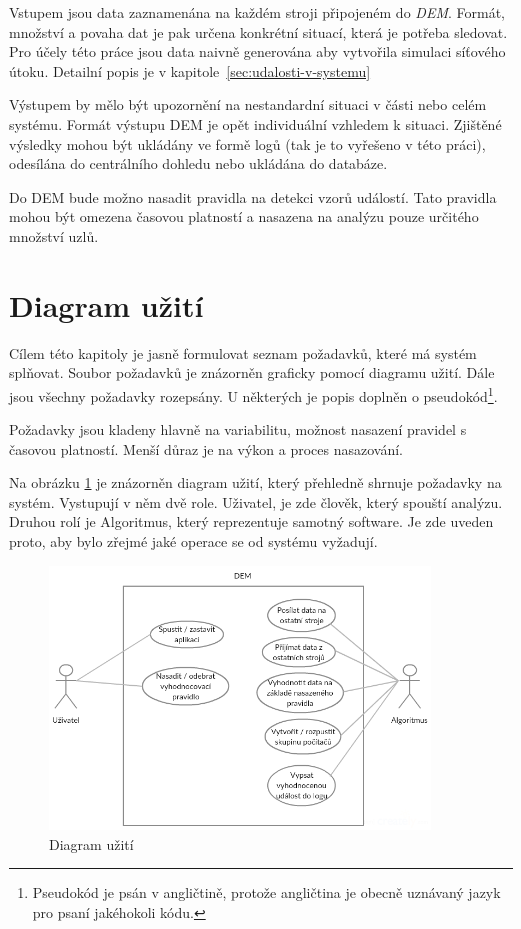 \documentclass[
  digital, %
  table,   %
  nolof,     %
  nolot,     %
  oneside, %
  nocover,
  monochrome,
  12pt
]{fithesis3}
\begin{document}
Vstupem jsou data zaznamenána na každém stroji připojeném do \textit{DEM}. Formát, množství a povaha dat je pak určena konkrétní situací, která je potřeba sledovat. Pro účely této práce jsou data naivně generována aby vytvořila simulaci síťového útoku. Detailní popis je v kapitole~\ref{sec:udalosti-v-systemu}

Výstupem by mělo být upozornění na nestandardní situaci v části nebo celém systému. Formát výstupu DEM je opět individuální vzhledem k situaci. Zjištěné výsledky mohou být ukládány ve formě logů (tak je to vyřešeno v této práci), odesílána do centrálního dohledu nebo ukládána do databáze.

Do DEM bude možno nasadit pravidla na detekci vzorů událostí. Tato pravidla mohou být omezena časovou platností a nasazena na analýzu pouze určitého množství uzlů.

\section{Diagram užití}
Cílem této kapitoly je jasně formulovat seznam požadavků, které má systém splňovat. Soubor požadavků je znázorněn graficky pomocí diagramu užití. Dále jsou všechny požadavky rozepsány. U některých je popis doplněn o pseudokód\footnote{Pseudokód je psán v angličtině, protože angličtina je obecně uznávaný jazyk pro psaní jakéhokoli kódu.}.

Požadavky jsou kladeny hlavně na variabilitu, možnost nasazení pravidel s časovou platností. Menší důraz je na výkon a proces nasazování.

Na obrázku \ref{fig:usecase} je znázorněn diagram užití, který přehledně shrnuje požadavky na systém. Vystupují v něm dvě role. Uživatel, je zde člověk, který spouští analýzu. Druhou rolí je Algoritmus, který reprezentuje samotný software. Je zde uveden proto, aby bylo zřejmé jaké operace se od systému vyžadují.

\begin{figure}[H]
	\centering
    \includegraphics[width=0.9\textwidth, height=0.45\textheight]{images/usecase.png}
    \caption{Diagram užití}
    \label{fig:usecase}
\end{figure}
\end{document}
